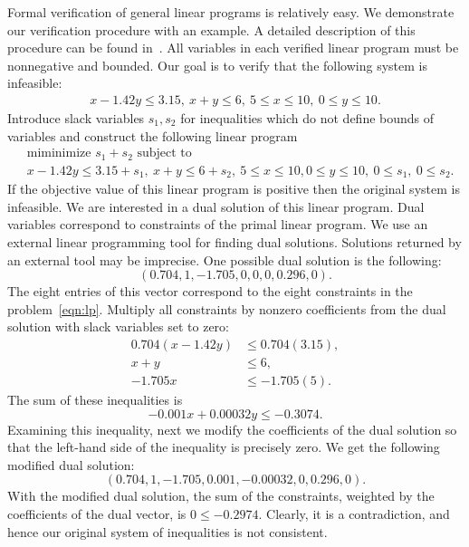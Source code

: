 Formal verification of general linear programs is relatively easy. We
demonstrate our verification procedure with an example. A detailed
description of this procedure can be found in~\cite{Solovyev:LP}. All
variables in each verified linear program must be nonnegative and
bounded. Our goal is to verify that the following system is
infeasible:
\begin{equation*}
\begin{split}
x - 1.42 y \le 3.15,\ x + y \le 6,\ 
5 \le x \le 10,\ 0 \le y \le 10.
\end{split}
\end{equation*}
Introduce slack variables $s_1, s_2$ for inequalities which do not
define bounds of variables and construct the following linear program
\begin{equation}\label{eqn:lp}
\begin{split}
&\text{miminimize $s_1 + s_2$ subject to}\\
&x - 1.42 y \le 3.15 + s_1,\ x + y \le 6 + s_2,\ 
5 \le x \le 10, 0 \le y \le 10,\ 
0 \le s_1,\ 0 \le  s_2.
\end{split}
\end{equation}
If the objective value of this linear program is positive then the
original system is infeasible. We are interested in a dual solution of
this linear program. Dual variables correspond to constraints of the
primal linear program. We use an external linear programming tool for
finding dual solutions. Solutions returned by an external tool may be
imprecise. One possible  dual solution is the following: 
\[
(0.704, 1,
-1.705, 0, 0, 0, 0.296, 0).\]
The eight entries of this vector correspond to the eight constraints
in the problem~\ref{eqn:lp}.
Multiply all
constraints by nonzero coefficients from the dual solution with
slack variables set to zero:
\begin{equation*}
\begin{split}
0.704 (x - 1.42 y) &\le 0.704 ( 3.15),\\
x + y &\le 6,\\
-1.705 x &\le -1.705 (5).
\end{split}
\end{equation*}
The sum of these inequalities is
\begin{equation*}
-0.001 x + 0.00032 y \le -0.3074.
\end{equation*}
Examining this inequality, next we modify the coefficients of the dual
solution so that the left-hand side of the inequality is precisely
zero.  We get the following modified dual solution:
\[
 (0.704, 1, -1.705, 0.001, -0.00032, 0, 0.296, 0).
\]
With the modified
dual solution, the sum of the constraints, weighted by the
coefficients of the dual vector, is $0 \le -0.2974$. Clearly, it is a
contradiction, and hence our original system of inequalities is not
consistent.

